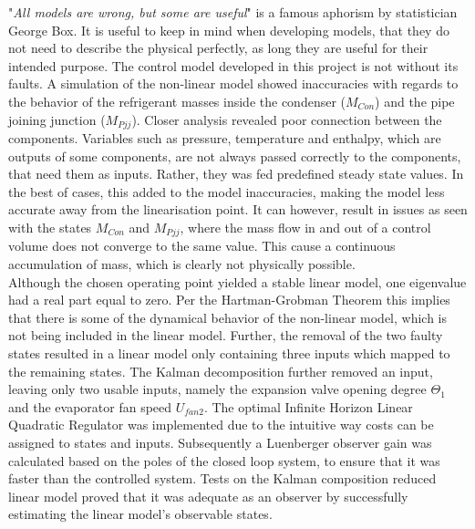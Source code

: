 "\textit{All models are wrong, but some are useful}" is a famous aphorism by statistician George Box. It is useful to keep in mind when developing models, that they do not need to describe the physical perfectly, as long they are useful for their intended purpose. The control model developed in this project is not without its faults. A simulation of the non-linear model showed inaccuracies with regards to the behavior of the refrigerant masses inside the condenser ($M_{Con}$) and the pipe joining junction ($M_{Pjj}$). Closer analysis revealed poor connection between the components. Variables such as pressure, temperature and enthalpy, which are outputs of some components, are not always passed correctly to the components, that need them as inputs. Rather, they was fed predefined steady state values. In the best of cases, this added to the model inaccuracies, making the model less accurate away from the linearisation point. It can however, result in issues as seen with the states $M_{Con}$ and $M_{Pjj}$, where the mass flow in and out of a control volume does not converge to the same value. This cause a continuous accumulation of mass, which is clearly not physically possible. \\

Although the chosen operating point yielded a stable linear model, one eigenvalue had a real part equal to zero. Per the Hartman-Grobman Theorem this implies that there is some of the dynamical behavior of the non-linear model, which is not being included in the linear model. Further, the removal of the two faulty states resulted in a linear model only containing three inputs which mapped to the remaining states. The Kalman decomposition further removed an input, leaving only two usable inputs, namely the expansion valve opening degree $\Theta_1$ and the evaporator fan speed $U_{fan2}$. The optimal Infinite Horizon Linear Quadratic Regulator was implemented due to the intuitive way costs can be assigned to states and inputs. Subsequently a Luenberger observer gain was calculated based on the poles of the closed loop system, to ensure that it was faster than the controlled system. Tests on the Kalman composition reduced linear model proved that it was adequate as an observer by successfully estimating the linear model's observable states.\\

